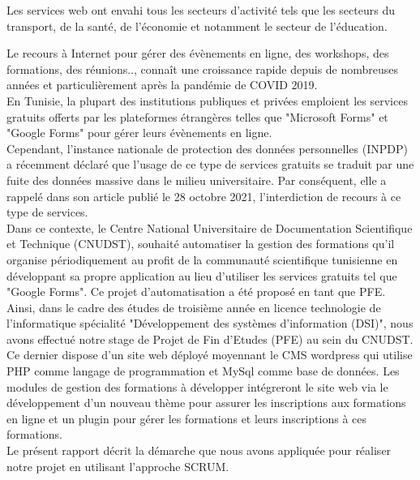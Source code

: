 

%
%


Les services web ont envahi tous les secteurs d'activité tels que les secteurs du transport, de la santé, de l'économie et notamment le secteur de l'éducation.

Le recours à Internet pour gérer des évènements en ligne, des workshops, des formations, des réunions.., connaît une croissance rapide depuis de nombreuses années et particulièrement après la pandémie de COVID 2019.\\
En Tunisie, la plupart des institutions publiques et privées emploient les services gratuits offerts par les plateformes étrangères telles que "Microsoft Forms" et "Google Forms" pour gérer leurs évènements en ligne.\\
Cependant, l'instance nationale de protection des données personnelles (INPDP) a récemment déclaré que l'usage de ce type de services gratuits se traduit par une fuite des données massive dans le milieu universitaire.
Par conséquent, elle a rappelé dans son article publié le 28 octobre 2021, l'interdiction de recours à ce type de services.\\
Dans ce contexte, le Centre National Universitaire de Documentation Scientifique et Technique (CNUDST), souhaité automatiser la gestion des formations qu'il organise périodiquement au profit de la communauté scientifique tunisienne en développant sa propre application au lieu d'utiliser les services gratuits tel que "Google Forms".
Ce projet d'automatisation a été proposé en tant que PFE.\\
Ainsi, dans le cadre des études de troisième année en licence technologie de l'informatique spécialité "Développement des systèmes d'information (DSI)", nous avons effectué notre stage de Projet de Fin d'Etudes (PFE) au sein du CNUDST.\\
Ce dernier dispose d'un site web déployé moyennant le CMS wordpress qui utilise PHP comme langage de programmation et MySql comme base de données. Les modules de gestion des formations à développer intégreront le site web via le développement d'un nouveau thème pour assurer les inscriptions aux formations en ligne et un plugin pour gérer les formations et leurs inscriptions à ces formations.\\
Le présent rapport décrit la démarche que nous avons appliquée pour réaliser notre projet en utilisant l'approche SCRUM.\\

